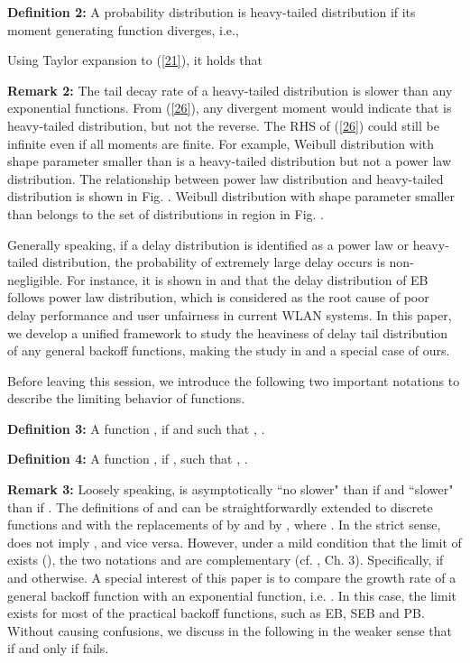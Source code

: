 \documentclass[journal]{IEEEtran}
\begin{document}
\textbf{Definition 2:} A probability distribution  is heavy-tailed distribution if its moment generating function diverges, i.e.,


Using Taylor expansion to (\ref{21}), it holds that


\textbf{Remark 2:} The tail decay rate of a heavy-tailed distribution is slower than any exponential functions. From (\ref{26}), any divergent moment  would indicate that  is heavy-tailed distribution, but not the reverse. The RHS of (\ref{26}) could still be infinite even if all moments are finite. For example, Weibull distribution with shape parameter smaller than  is a heavy-tailed distribution but not a power law distribution. The relationship between power law distribution and heavy-tailed distribution is shown in Fig. . Weibull distribution with shape parameter smaller than  belongs to the set of distributions in region  in Fig. .

Generally speaking, if a delay distribution is identified as a power law or heavy-tailed distribution, the probability of extremely large delay occurs is non-negligible. For instance, it is shown in \cite{2009:Cho} and \cite{2007:Sakurai} that the delay distribution of EB follows power law distribution, which is considered as the root cause of poor delay performance and user unfairness in current WLAN systems. In this paper, we develop a unified framework to study the heaviness of delay tail distribution of any general backoff functions, making the study in \cite{2009:Cho} and \cite{2007:Sakurai} a special case of ours.

Before leaving this session, we introduce the following two important notations to describe the limiting behavior of functions.

\textbf{Definition 3:} A function , if  and  such that , .

\textbf{Definition 4:} A function , if ,  such that , .

\textbf{Remark 3:} Loosely speaking,  is asymptotically ``no slower" than  if  and ``slower" than  if . The definitions of  and  can be straightforwardly extended to discrete functions  and  with the replacements of  by  and  by , where . In the strict sense,  does not imply , and vice versa. However, under a mild condition that the limit of  exists (), the two notations  and  are complementary (cf. \cite{2009:Cormen}, Ch. 3). Specifically,  if  and  otherwise. A special interest of this paper is to compare the growth rate of a general backoff function  with an exponential function, i.e. . In this case, the limit  exists for most of the practical backoff functions, such as EB, SEB and PB. Without causing confusions, we discuss in the following in the weaker sense that  if and only if  fails.
\end{document}
